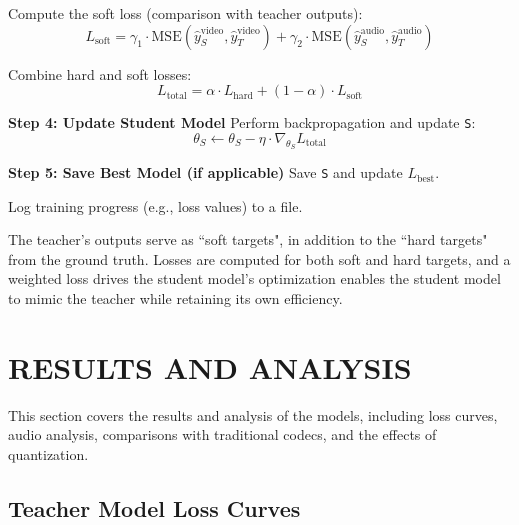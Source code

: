 \documentclass{ioereport}
\begin{document}
\begin{algorithm}[ht!]
\begin{algorithmic}[1]
            \STATE Compute the soft loss (comparison with teacher outputs):
            \[
            L_\text{soft} = \gamma_1 \cdot \text{MSE}(\hat{y}_S^\text{video}, \hat{y}_T^\text{video}) +
                            \gamma_2 \cdot \text{MSE}(\hat{y}_S^\text{audio}, \hat{y}_T^\text{audio})
            \]

            \STATE Combine hard and soft losses:
            \[
            L_\text{total} = \alpha \cdot L_\text{hard} + (1 - \alpha) \cdot L_\text{soft}
            \]
    
            \STATE \textbf{Step 4: Update Student Model}
            \STATE Perform backpropagation and update \texttt{S}:
            \[
            \theta_S \gets \theta_S - \eta \cdot \nabla_{\theta_S} L_\text{total}
            \]
    
            \STATE \textbf{Step 5: Save Best Model (if applicable)}
                \STATE Save \texttt{S} and update \texttt{$L_\text{best}$}.
            \ENDIF
    
            \STATE Log training progress (e.g., loss values) to a file.
        \ENDFOR
    \end{algorithmic}
\end{algorithm}
The teacher's outputs serve as ``soft targets", in addition to the ``hard targets" from the ground truth. Losses are computed for both soft and hard targets, and a weighted loss drives the student model's optimization enables the student model to mimic the teacher while retaining its own efficiency.


    

\pagebreak 

\section{\MakeUppercase{Results and Analysis}}
This section covers the results and analysis of the models, including loss curves, audio analysis, comparisons with traditional codecs, and the effects of quantization.

\subsection{Teacher Model Loss Curves}
\end{document}
